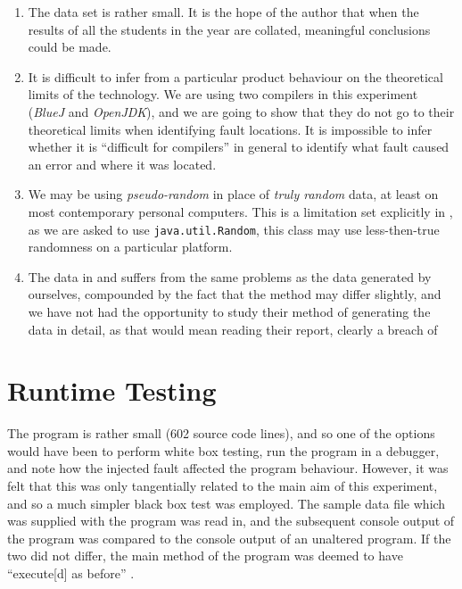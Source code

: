 \documentclass[10pt]{report}
\begin{document}
\begin{enumerate}
\item The data set is rather small.  It is the hope of the author that when the results of all the students in the year are collated, meaningful conclusions could be made.

\item It is difficult to infer from a particular product behaviour on the theoretical limits of the technology.  We are using two compilers in this experiment ({\em BlueJ} and {\em OpenJDK}), and we are going to show that they do not go to their theoretical limits when identifying fault locations.  It is impossible to infer whether it is ``difficult for compilers'' in general to identify what fault caused an error and where it was located.

\item We may be using {\em pseudo-random} in place of {\em truly random} data, at least on most contemporary personal computers.  This is a limitation set explicitly in \cite{bradley}, as we are asked to use {\tt java.util.Random}, this class may use less-then-true randomness on a particular platform.

\item The data in \cite{nugee} and \cite{hoad} suffers from the same problems as the data generated by ourselves, compounded by the fact that the method may differ slightly, and we have not had the opportunity to study their method of generating the data in detail, as that would mean reading their report, clearly a breach of \cite[§6.3.5]{plagiarism}

\end{enumerate}


\section{Runtime Testing}

The program is rather small (602 source code lines), and so one of the options would have been to perform white box testing, run the program in a debugger, and note how the injected fault affected the program behaviour.  However, it was felt that this was only tangentially related to the main aim of this experiment, and so a much simpler black box test was employed.  The sample data file which was supplied with the program was read in, and the subsequent console output of the program was compared to the console output of an unaltered program.  If the two did not differ, the main method of the program was deemed to have ``execute[d] as before'' \cite[p2]{bradley}.
\end{document}

